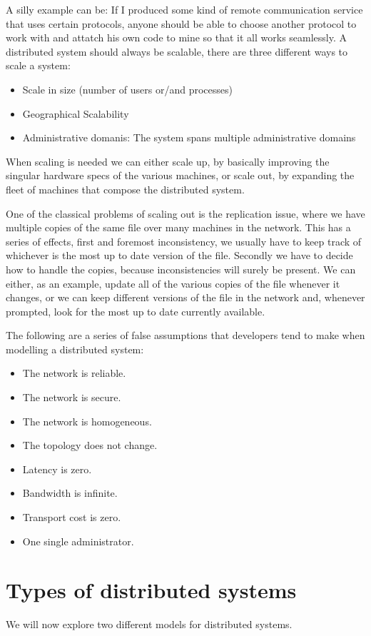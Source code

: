 A silly example can be: If I produced some kind of remote communication service that uses certain protocols, anyone should be able to choose another protocol to work with and attatch his own code to mine so that it all works seamlessly. A distributed system should always be scalable, there are three different ways to scale a system:
\begin{itemize}
	\item Scale in size (number of users or/and processes)
	\item Geographical Scalability
	\item Administrative domanis: The system spans multiple administrative domains
\end{itemize}
When scaling is needed we can either scale up, by basically improving the singular hardware specs of the various machines, or scale out, by expanding the fleet of machines that compose the distributed system.

One of the classical problems of scaling out is the replication issue, where we have multiple copies of the same file over many machines in the network. This has a series of effects, first and foremost inconsistency, we usually have to keep track of whichever is the most up to date version of the file. Secondly we have to decide how to handle the copies, because inconsistencies will surely be present. We can either, as an example, update all of the various copies of the file whenever it changes, or we can keep different versions of the file in the network and, whenever prompted, look for the most up to date currently available.

The following are a series of false assumptions that developers tend to make when modelling a distributed system:
\begin{itemize}
	\item The network is reliable.
	\item The network is secure.
	\item The network is homogeneous.
	\item The topology does not change.
	\item Latency is zero.
	\item Bandwidth is infinite.
	\item Transport cost is zero.
	\item One single administrator.
\end{itemize}
\section{Types of distributed systems}
We will now explore two different models for distributed systems.
